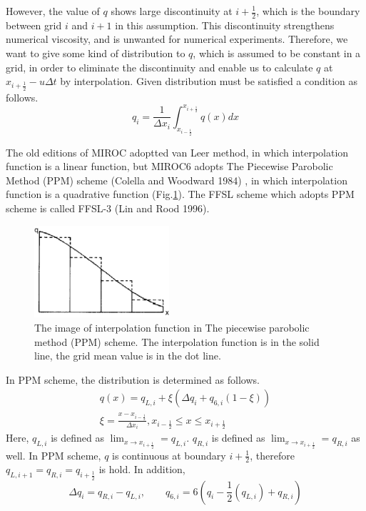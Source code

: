 However, the value of $q$ shows large discontinuity at $i+\frac{1}{2}$, which is the boundary between grid $i$ and $i+1$ in this assumption.
This discontinuity strengthens numerical viscosity, and is unwanted for numerical experiments.
Therefore, we want to give some kind of distribution to $q$, which is assumed to be constant in a grid, in order to eliminate the discontinuity and enable us to calculate $q$ at $x_{i+\frac{1}{2}}-u\Delta t$ by interpolation.
Given distribution must be satisfied a condition as follows.
\begin{equation}
  q_{i}=\frac{1}{\Delta x_{i}} \int_{x_{i-\frac{1}{2}}}^{x_{i+\frac{1}{2}}} q(x) dx
\end{equation}

The old editions of MIROC adoptted van Leer method, in which interpolation function is a linear function, but MIROC6 adopts The Piecewise Parobolic Method (PPM) scheme (Colella and Woodward 1984) , in which interpolation function is a quadrative function (Fig.\ref{f1}). The FFSL scheme which adopts PPM scheme is called FFSL-3 (Lin and Rood 1996).

\begin{figure}
  \centering
  \includegraphics[width=5cm]{ppm_interpolate.png}
  \caption{The image of interpolation function in The piecewise parobolic method (PPM) scheme. The interpolation function is in the solid line, the grid mean value is in the dot line.}
  \label{f1}
\end{figure}

In PPM scheme, the distribution is determined as follows.
\begin{equation}
\begin{split}
\label{a4}
  q(x)=q_{L,i}+\xi (\Delta q_{i}+q_{6,i}(1-\xi))\\
  \xi=\frac{x-x_{i-\frac{1}{2}}}{\Delta x_{i}},  x_{i-\frac{1}{2}}\leq x \leq x_{i+\frac{1}{2}}
  \end{split}
\end{equation}
Here, $q_{L,i}$ is defined as $\lim_{x \to x_{i+\frac{1}{2}}}=q_{L,i}$.
$q_{R,i}$ is defined as $\lim_{x \to x_{i+\frac{1}{2}}}=q_{R,i}$ as well.
In PPM scheme, $q$ is continuous at boundary $i+\frac{1}{2}$, therefore $q_{L,i+1}=q_{R,i}=q_{i+\frac{1}{2}}$ is hold.
In addition,
\begin{equation}
  \Delta q_{i}=q_{R,i}-q_{L,i},\qquad q_{6,i}=6(q_{i}-\frac{1}{2}(q_{L,i})+q_{R,i})
\end{equation}


